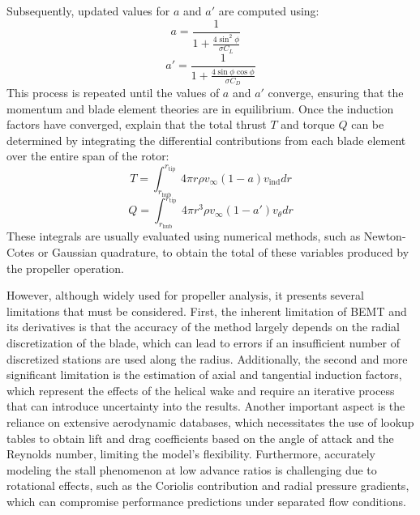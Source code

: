 \documentclass{Format}
\begin{document}
Subsequently, updated values for \(a\) and \(a'\) are computed using:
\begin{equation}
    a = \frac{1}{1 + \frac{4 \sin^2 \phi}{\sigma C_L}} \ \  \ \ 
\end{equation}
\begin{equation}
    a' = \frac{1}{1 + \frac{4 \sin \phi \cos \phi}{\sigma C_D}}
\end{equation}
This process is repeated until the values of \(a\) and \(a'\) converge, ensuring that the momentum and blade element theories are in equilibrium. Once the induction factors have converged, \cite{ning2021} explain that the total thrust \(T\) and torque \(Q\) can be determined by integrating the differential contributions from each blade element over the entire span of the rotor:
\begin{equation}
T = \int_{r_{\text{hub}}}^{r_{\text{tip}}} 4 \pi r \rho v_{\infty} (1 - a) v_{\text{ind}} dr 
\end{equation}
\begin{equation}
Q = \int_{r_{\text{hub}}}^{r_{\text{tip}}} 4 \pi r^3 \rho v_{\infty} (1 - a') v_{\theta} dr
\end{equation}
These integrals are usually evaluated using numerical methods,  such as Newton-Cotes or Gaussian quadrature, to obtain the total of these variables produced by the propeller operation.

However, although widely used for propeller analysis, it presents several limitations that must be considered. First, the inherent limitation of BEMT and its derivatives is that the accuracy of the method largely depends on the radial discretization of the blade, which can lead to errors if an insufficient number of discretized stations are used along the radius. Additionally, the second and more significant limitation is the estimation of axial and tangential induction factors, which represent the effects of the helical wake and require an iterative process that can introduce uncertainty into the results. Another important aspect is the reliance on extensive aerodynamic databases, which necessitates the use of lookup tables to obtain lift and drag coefficients based on the angle of attack and the Reynolds number, limiting the model's flexibility. Furthermore, accurately modeling the stall phenomenon at low advance ratios is challenging due to rotational effects, such as the Coriolis contribution and radial pressure gradients, which can compromise performance predictions under separated flow conditions.
\end{document}
